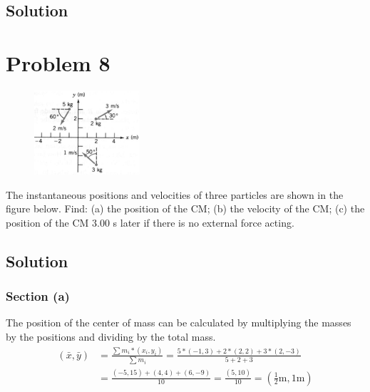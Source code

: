 \documentclass[12pt]{article}
\begin{document}
\subsection*{Solution}


\pagebreak
\section*{Problem 8}
\begin{figure}
    \vspace{-30pt}
    \includegraphics[width=0.35\textwidth]{graph_8.png} 
\end{figure}
The instantaneous positions and velocities of three particles are shown in the figure below. Find: (a)
the position of the CM; (b) the velocity of the CM; (c) the position of the CM 3.00 s later if there is no
external force acting.

\subsection*{Solution}
\subsubsection*{Section (a)}
The position of the center of mass can be calculated by multiplying the masses by the positions and dividing by the total mass.
\begin{align}
    (\bar{x},\bar{y})   &=  \frac{\sum m_i*(x_i,y_i)}{\sum m_i}
        =   \frac{5*(-1,3) + 2*(2,2) + 3*(2,-3)}{5 + 2 + 3}\\
        &=  \frac{(-5,15) + (4,4) + (6,-9)}{10} = \frac{(5,10)}{10}
        =   \boxed{\left(\frac{1}{2}\unit{\meter},1\unit{\meter}\right)}
\end{align}
\end{document}
